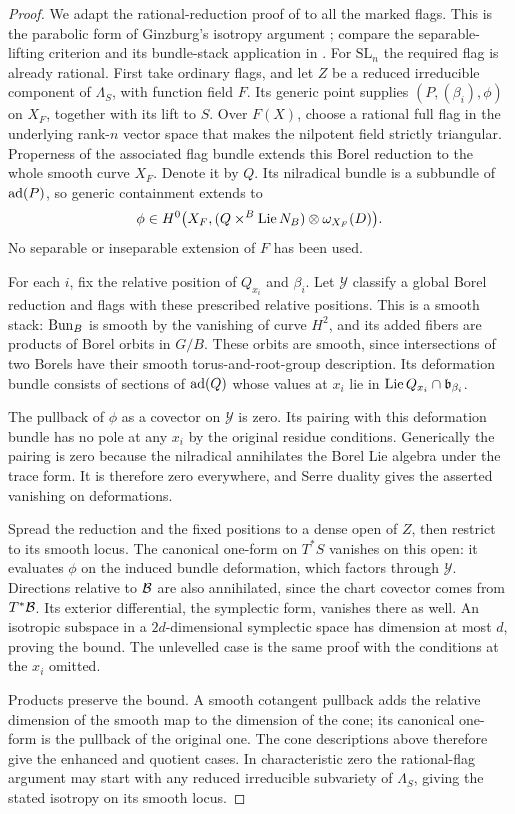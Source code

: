 \begin{proof}
We adapt the rational-reduction proof of \cite[Proposition~3.1]{CT}
to all the marked flags.  This is the parabolic form of Ginzburg's
isotropy argument \cite[Lemma~7]{GinzburgNilpotent}; compare the
separable-lifting criterion and its bundle-stack application in
\cite[Appendix~D.1.5 and~D.1.8]{AGKRRV}.  For $\mathrm{SL}_n$ the
required flag is already rational.  First take ordinary flags, and let $Z$ be a
reduced irreducible component of $\Lambda_S$, with function field $F$.
Its generic point supplies $(P,(\beta_i),\phi)$ on $X_F$, together
with its lift to $S$.  Over $F(X)$, choose a rational full flag in the
underlying rank-$n$ vector space that makes the nilpotent field strictly
triangular.  Properness of the associated flag bundle extends this
Borel reduction to the whole smooth curve $X_F$.  Denote it by $Q$.
Its nilradical bundle is a subbundle of $\operatorname{ad}(P)$, so generic
containment extends to
\[
 \phi\in H^0\bigl(X_F,
       (Q\times^B\operatorname{Lie} N_B)\otimes\omega_{X_F}(D)\bigr).
\]
No separable or inseparable extension of $F$ has been used.

For each $i$, fix the relative position of $Q_{x_i}$ and $\beta_i$.
Let $\mathcal Y$ classify a global Borel reduction and flags with
these prescribed relative positions.  This is a smooth stack:
$\operatorname{Bun}_B$ is smooth by the vanishing of curve $H^2$, and its added
fibers are products of Borel orbits in $G/B$.  These orbits are smooth,
since intersections of two Borels have their smooth torus-and-root-group
description.  Its deformation bundle consists of sections of
$\operatorname{ad}(Q)$ whose values at $x_i$ lie in
$\operatorname{Lie} Q_{x_i}\cap\mathfrak b_{\beta_i}$.

The pullback of $\phi$ as a covector on $\mathcal Y$ is zero.  Its
pairing with this deformation bundle has no pole at any $x_i$ by the
original residue conditions.  Generically the pairing is zero because
the nilradical annihilates the Borel Lie algebra under the trace form.
It is therefore zero everywhere, and Serre duality gives the asserted
vanishing on deformations.

Spread the reduction and the fixed positions to a dense open of $Z$,
then restrict to its smooth locus.  The canonical one-form on $T^*S$
vanishes on this open: it evaluates $\phi$ on the induced bundle
deformation, which factors through $\mathcal Y$.  Directions relative
to $\mathcal B$ are also annihilated, since the chart covector comes from
$T^*\mathcal B$.  Its exterior differential, the symplectic form, vanishes
there as well.  An isotropic subspace in a $2d$-dimensional symplectic
space has dimension at most $d$, proving the bound.  The unlevelled
case is the same proof with the conditions at the $x_i$ omitted.

Products preserve the bound.  A smooth cotangent pullback adds the
relative dimension of the smooth map to the dimension of the cone;
its canonical one-form is the pullback of the original one.  The cone
descriptions above therefore give the enhanced and quotient cases.
In characteristic zero the rational-flag argument may start with any
reduced irreducible subvariety of $\Lambda_S$, giving the stated
isotropy on its smooth locus.
\end{proof}

